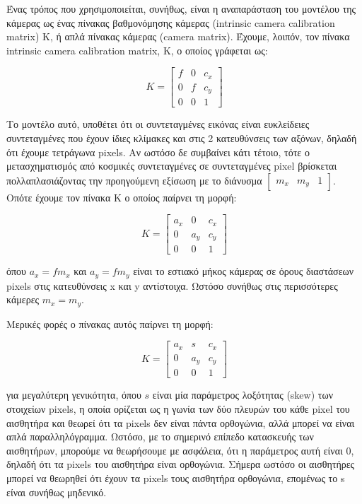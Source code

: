 Ένας τρόπος που χρησιμοποιείται, συνήθως, είναι η αναπαράσταση του μοντέλου της κάμερας ως ένας πίνακας βαθμονόμησης κάμερας (intrinsic camera calibration matrix) K, ή απλά πίνακας κάμερας (camera matrix).  Έχουμε, λοιπόν, τον πίνακα intrinsic camera calibration matrix, Κ, ο οποίος γράφεται ως:


\begin{equation}
K=
\begin{bmatrix}
f & 0 & c_{x}\\
0 & f & c_{y}\\
0 & 0 & 1
\end{bmatrix}
\end{equation}



Το μοντέλο αυτό, υποθέτει ότι οι συντεταγμένες εικόνας είναι ευκλείδειες συντεταγμένες που έχουν ίδιες κλίμακες και στις 2 κατευθύνσεις των αξόνων, δηλαδή ότι έχουμε τετράγωνα pixels. Αν ωστόσο δε συμβαίνει κάτι τέτοιο, τότε ο μετασχηματισμός από κοσμικές συντεταγμένες σε συντεταγμένες pixel βρίσκεται πολλαπλασιάζοντας την προηγούμενη εξίσωση με το διάνυσμα $\begin{bmatrix}m_{x} & m_{y} & 1\end{bmatrix}$. Οπότε έχουμε τον πίνακα K ο οποίος παίρνει τη μορφή:

\begin{equation}
K=
\begin{bmatrix}
a_{x} & 0 & c_{x}\\
0 & a_{y} & c_{y}\\
0 & 0 & 1
\end{bmatrix}
\end{equation}

όπου $a_{x}=fm_{x}$ και $a_{y}=fm_{y}$ είναι το εστιακό μήκος κάμερας σε όρους διαστάσεων pixels στις κατευθύνσεις x και y αντίστοιχα. Ωστόσο συνήθως στις περισσότερες κάμερες $m_{x}=m_{y}$.

Μερικές φορές ο πίνακας αυτός παίρνει τη μορφή:

\begin{equation}
K=
\begin{bmatrix}
a_{x} & s & c_{x}\\
0 & a_{y} & c_{y}\\
0 & 0 & 1
\end{bmatrix}
\end{equation}

για μεγαλύτερη γενικότητα, όπου $s$ είναι μία παράμετρος λοξότητας (skew) των στοιχείων pixels, η οποία ορίζεται ως η γωνία των δύο πλευρών του κάθε pixel του αισθητήρα και θεωρεί ότι τα pixels δεν είναι πάντα ορθογώνια, αλλά μπορεί να είναι απλά παραλληλόγραμμα. Ωστόσο, με το σημερινό επίπεδο κατασκευής των αισθητήρων, μπορούμε να θεωρήσουμε με ασφάλεια, ότι η παράμετρος αυτή είναι 0, δηλαδή ότι τα pixels του αισθητήρα είναι ορθογώνια.
Σήμερα ωστόσο οι αισθητήρες μπορεί να θεωρηθεί ότι έχουν τα pixels τους αισθητήρα ορθογώνια, επομένως το s είναι συνήθως μηδενικό. 





